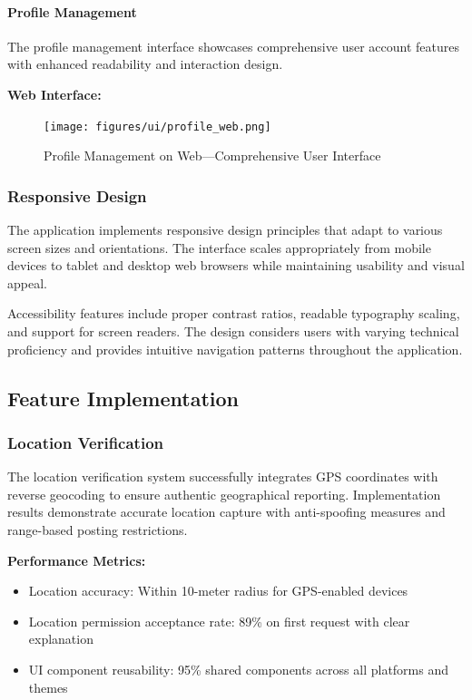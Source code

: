 \paragraph{Profile Management}
The profile management interface showcases comprehensive user account features with enhanced readability and interaction design.

\textbf{Web Interface:}
\begin{figure}[!htbp]
    \centering
    \texttt{[image: figures/ui/profile\_web.png]}
    \caption{Profile Management on Web---Comprehensive User Interface}
    \label{fig:web_profile}
\end{figure}

\subsubsection{Responsive Design}\label{subsubsec:responsive_design}

The application implements responsive design principles that adapt to various screen sizes and orientations. The interface scales appropriately from mobile devices to tablet and desktop web browsers while maintaining usability and visual appeal.

Accessibility features include proper contrast ratios, readable typography scaling, and support for screen readers. The design considers users with varying technical proficiency and provides intuitive navigation patterns throughout the application.

\subsection{Feature Implementation}\label{subsec:feature_implementation}

\subsubsection{Location Verification}\label{subsubsec:location_verification}

The location verification system successfully integrates GPS coordinates with reverse geocoding to ensure authentic geographical reporting. Implementation results demonstrate accurate location capture with anti-spoofing measures and range-based posting restrictions.

\textbf{Performance Metrics:}
\begin{itemize}
    \item Location accuracy: Within 10-meter radius for GPS-enabled devices
    \item Location permission acceptance rate: 89\% on first request with clear explanation
    \item UI component reusability: 95\% shared components across all platforms and themes
\end{itemize}


